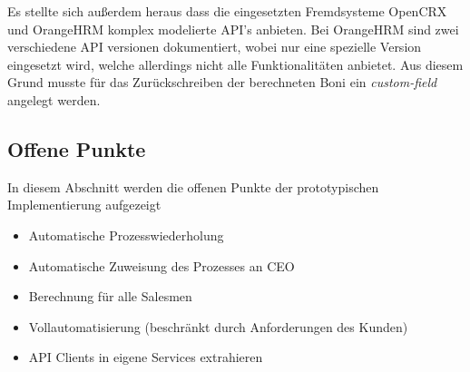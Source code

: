 \documentclass[]{article}
\begin{document}
Es stellte sich außerdem heraus dass die eingesetzten Fremdsysteme OpenCRX und OrangeHRM komplex modelierte API's anbieten. Bei OrangeHRM sind zwei verschiedene API versionen dokumentiert, wobei nur eine spezielle Version eingesetzt wird, welche allerdings nicht alle Funktionalitäten anbietet. Aus diesem Grund musste für das Zurückschreiben der berechneten Boni ein \emph{custom-field} angelegt werden.
\subsection{Offene Punkte}
In diesem Abschnitt werden die offenen Punkte der prototypischen Implementierung aufgezeigt
\begin{itemize}
	\item Automatische Prozesswiederholung
	\item Automatische Zuweisung des Prozesses an CEO
	\item Berechnung für alle Salesmen
	\item Vollautomatisierung (beschränkt durch Anforderungen des Kunden)
	\item API Clients in eigene Services extrahieren
\end{itemize}
\end{document}
